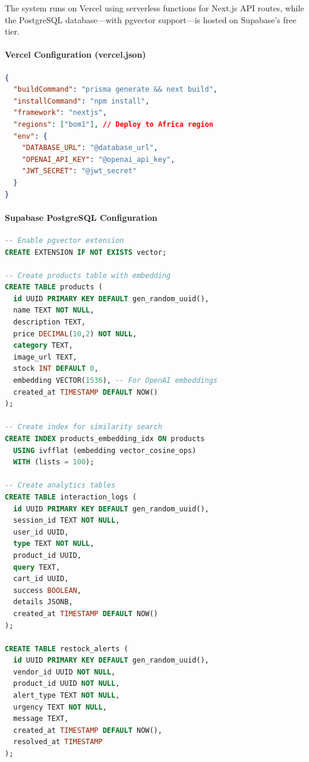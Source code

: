 \documentclass[12pt,a4paper]{article}
\begin{document}
The system runs on Vercel using serverless functions for Next.js API routes, while the PostgreSQL database---with pgvector support---is hosted on Supabase's free tier.

\paragraph{Vercel Configuration (vercel.json)}

\begin{lstlisting}[language=JSON, caption=Vercel Configuration]
{
  "buildCommand": "prisma generate && next build",
  "installCommand": "npm install",
  "framework": "nextjs",
  "regions": ["bom1"], // Deploy to Africa region
  "env": {
    "DATABASE_URL": "@database_url",
    "OPENAI_API_KEY": "@openai_api_key",
    "JWT_SECRET": "@jwt_secret"
  }
}
\end{lstlisting}

\paragraph{Supabase PostgreSQL Configuration}

\begin{lstlisting}[language=SQL, caption=Supabase Database Configuration]
-- Enable pgvector extension
CREATE EXTENSION IF NOT EXISTS vector;

-- Create products table with embedding
CREATE TABLE products (
  id UUID PRIMARY KEY DEFAULT gen_random_uuid(),
  name TEXT NOT NULL,
  description TEXT,
  price DECIMAL(10,2) NOT NULL,
  category TEXT,
  image_url TEXT,
  stock INT DEFAULT 0,
  embedding VECTOR(1536), -- For OpenAI embeddings
  created_at TIMESTAMP DEFAULT NOW()
);

-- Create index for similarity search
CREATE INDEX products_embedding_idx ON products
  USING ivfflat (embedding vector_cosine_ops)
  WITH (lists = 100);

-- Create analytics tables
CREATE TABLE interaction_logs (
  id UUID PRIMARY KEY DEFAULT gen_random_uuid(),
  session_id TEXT NOT NULL,
  user_id UUID,
  type TEXT NOT NULL,
  product_id UUID,
  query TEXT,
  cart_id UUID,
  success BOOLEAN,
  details JSONB,
  created_at TIMESTAMP DEFAULT NOW()
);

CREATE TABLE restock_alerts (
  id UUID PRIMARY KEY DEFAULT gen_random_uuid(),
  vendor_id UUID NOT NULL,
  product_id UUID NOT NULL,
  alert_type TEXT NOT NULL,
  urgency TEXT NOT NULL,
  message TEXT,
  created_at TIMESTAMP DEFAULT NOW(),
  resolved_at TIMESTAMP
);
\end{lstlisting}
\end{document}
